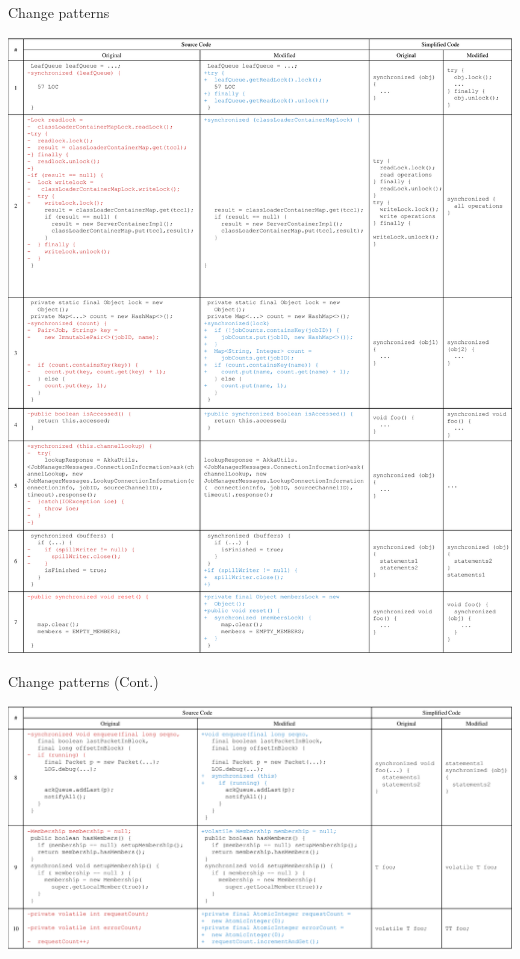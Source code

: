 \begin{table}
	\centering
\caption{Change patterns}\vspace*{-1ex}
	\includegraphics[width=1\textwidth]{patterns}	
	\label{table:patterns}\vspace*{-3ex}

\end{table}
\begin{table}
	\centering
	\caption{Change patterns (Cont.)}\vspace*{-1ex}
	\includegraphics[width=1\textwidth]{patterns2}
	\label{table:patterns2}\vspace*{-3ex}
\end{table}
